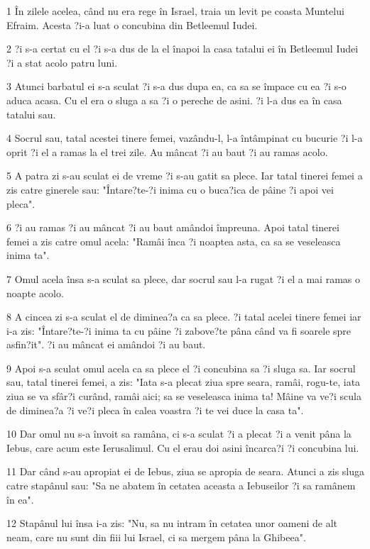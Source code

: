\par 1 În zilele acelea, când nu era rege în Israel, traia un levit pe coasta Muntelui Efraim. Acesta ?i-a luat o concubina din Betleemul Iudei.
\par 2 ?i s-a certat cu el ?i s-a dus de la el înapoi la casa tatalui ei în Betleemul Iudei ?i a stat acolo patru luni.
\par 3 Atunci barbatul ei s-a sculat ?i s-a dus dupa ea, ca sa se împace cu ea ?i s-o aduca acasa. Cu el era o sluga a sa ?i o pereche de asini. ?i l-a dus ea în casa tatalui sau.
\par 4 Socrul sau, tatal acestei tinere femei, vazându-l, l-a întâmpinat cu bucurie ?i l-a oprit ?i el a ramas la el trei zile. Au mâncat ?i au baut ?i au ramas acolo.
\par 5 A patra zi s-au sculat ei de vreme ?i s-au gatit sa plece. Iar tatal tinerei femei a zis catre ginerele sau: "Întare?te-?i inima cu o buca?ica de pâine ?i apoi vei pleca".
\par 6 ?i au ramas ?i au mâncat ?i au baut amândoi împreuna. Apoi tatal tinerei femei a zis catre omul acela: "Ramâi înca ?i noaptea asta, ca sa se veseleasca inima ta".
\par 7 Omul acela însa s-a sculat sa plece, dar socrul sau l-a rugat ?i el a mai ramas o noapte acolo.
\par 8 A cincea zi s-a sculat el de diminea?a ca sa plece. ?i tatal acelei tinere femei iar i-a zis: "Întare?te-?i inima ta cu pâine ?i zabove?te pâna când va fi soarele spre asfin?it". ?i au mâncat ei amândoi ?i au baut.
\par 9 Apoi s-a sculat omul acela ca sa plece el ?i concubina sa ?i sluga sa. Iar socrul sau, tatal tinerei femei, a zis: "Iata s-a plecat ziua spre seara, ramâi, rogu-te, iata ziua se va sfâr?i curând, ramâi aici; sa se veseleasca inima ta! Mâine va ve?i scula de diminea?a ?i ve?i pleca în calea voastra ?i te vei duce la casa ta".
\par 10 Dar omul nu s-a învoit sa ramâna, ci s-a sculat ?i a plecat ?i a venit pâna la Iebus, care acum este Ierusalimul. Cu el erau doi asini încarca?i ?i concubina lui.
\par 11 Dar când s-au apropiat ei de Iebus, ziua se apropia de seara. Atunci a zis sluga catre stapânul sau: "Sa ne abatem în cetatea aceasta a Iebuseilor ?i sa ramânem în ea".
\par 12 Stapânul lui însa i-a zis: "Nu, sa nu intram în cetatea unor oameni de alt neam, care nu sunt din fiii lui Israel, ci sa mergem pâna la Ghibeea".
